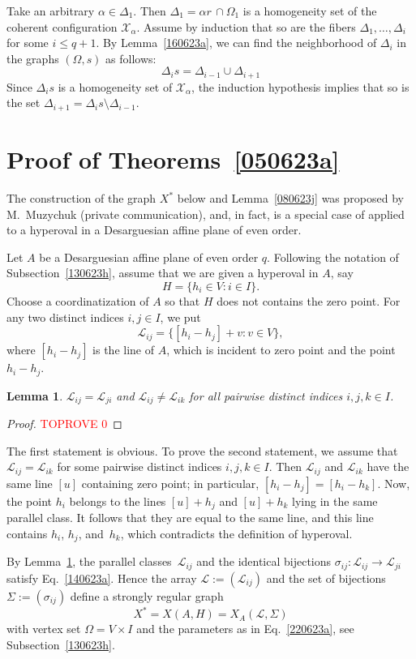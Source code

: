 \documentclass{amsart}
\newcommand{\cal}{\mathcal}
\newtheorem{lemma}[formula]{Lemma}
\def\qtnl#1{\begin{equation}\label{#1}}
\def\eqtn{\end{equation}}
\def\lmml#1{\begin{lemma}\label{#1}}
\def\elmm{\end{lemma}}
\def\prf{\begin{proof}\textcolor{red}{TOPROVE 0}\end{proof}}
\def\cL{{\cal L}}
\def\cX{{\cal X}}
\begin{document}
Take an arbitrary $\alpha\in \Delta_1$.  Then $\Delta_1=\alpha r\,\cap \Omega_1$ is a homogeneity set of  the coherent configuration $\cX_\alpha$. Assume by induction  that so are the fibers $\Delta_1,\ldots,\Delta_i$ for some $i\le q+1$. By Lemma~\ref{160623a}, we can find the neighborhood of $\Delta_i$ in the graphs $(\Omega,s)$ 
as follows:
$$
\Delta_i s =\Delta_{i-1}\cup\Delta_{i+1}
$$ 
Since $\Delta_i s$ is a homogeneity set of  $\cX_\alpha$, the induction hypothesis implies that so is the set $\Delta_{i+1}=\Delta_i s\setminus \Delta_{i-1}$. 
\eprf




\section{Proof of Theorems~\ref{050623a} }\label{230623j}
The construction of the graph $X^*$ below and Lemma~\ref{080623j} was proposed by M.~Muzychuk (private communication), and, in fact, is a special case of \cite[Proposition~5.1]{Muzychuk2009F} applied  to a hyperoval in a Desarguesian affine plane  of even order.
 
Let $A$ be a Desarguesian affine plane  of even order $q$. Following 
the notation of Subsection~\ref{130623h}, assume that  we are given 
a hyperoval in $A$, say
$$
H=\{h_i\in V\colon i\in I\}.
$$ 
Choose a coordinatization of $A$ so that $H$ does not contains the zero point. For any two distinct indices $i,j\in I$, we put  
\qtnl{220623w}
 \cL_{ij}=\{[h_i-h_j]+v\colon v\in V\},
\eqtn
 where $[h_i-h_j]$  is  the line of $A$, which is incident to zero point and the point $h_i-h_j$.
 
\lmml{150623a}
$\cL_{ij}=\cL_{ji}$ and $\cL_{ij}\ne \cL_{ik}$ for all pairwise distinct indices $i,j,k\in I$.
 \elmm
 \prf
The first statement is obvious.  To prove the second statement, we assume that $\cL_{ij}=\cL_{ik}$ for some pairwise distinct indices $i,j,k\in I$. Then $\cL_{ij}$ and $\cL_{ik}$ have the same line $[u]$ containing zero point; in particular, $[h_i-h_j]=[h_i-h_k]$. Now, the point $h_i$ belongs to the lines  $[u]+h_j$ and $[u]+h_k$ lying in  the same parallel class.  It follows that  they are equal to the same line, and this line contains $h_i$, $h_j$, and~$h_k$, which contradicts the definition of hyperoval.
 \eprf
 
By Lemma~\ref{150623a}, 
the parallel classes~$\cL_{ij}$ and 
the identical bijections $\sigma_{ij}\colon\cL_{ij}\to\cL_{ji}$ 
satisfy Eq.~\eqref{140623a}. 
Hence the array $\cL:=(\cL_{ij})$ 
and the set of bijections $\Sigma:=(\sigma_{ij})$ 
define a strongly regular graph
$$
X^*=X(A,H)=X_A(\cL,\Sigma)
$$
with vertex set $\Omega=V\times I$ and the parameters as in Eq.~\eqref{220623a}, see Subsection~\ref{130623h}.
\end{document}
